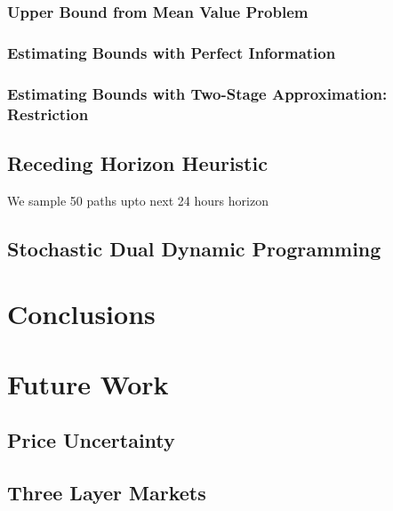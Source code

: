 \documentclass[11pt,twoside]{article}
\begin{document}
\subsubsection{Upper Bound from Mean Value Problem}


\subsubsection{Estimating Bounds with Perfect Information}
\subsubsection{Estimating Bounds with Two-Stage 	Approximation: Restriction}
\subsection{Receding Horizon Heuristic}
We sample 50 paths upto next 24 hours horizon 
\subsection{Stochastic Dual Dynamic Programming}
\section{Conclusions}
\section{Future Work}
\subsection{Price Uncertainty}
\subsection{Three Layer Markets}




\end{document}
